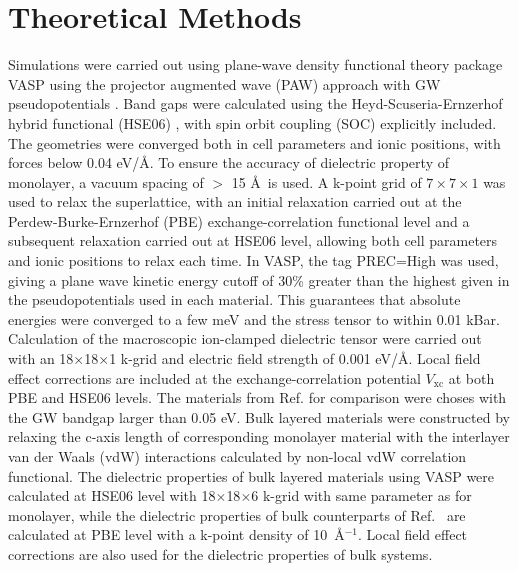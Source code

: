 \section{Theoretical Methods}
\label{sec:diel-org8457dbb}

Simulations were carried out using plane-wave density functional
theory package VASP
\cite{Kresse_1993_MD_liquid_metal,Kresse_1996_1,Kresse_1996_2} using
the projector augmented wave (PAW) approach with GW pseudopotentials
\cite{Kresse_1999_pseudopotentials}. Band gaps were calculated using
the Heyd-Scuseria-Ernzerhof hybrid functional (HSE06)
\cite{Heyd_2003_HSe,HSE_2006_erratum}, with spin orbit coupling (SOC) explicitly
included. The geometries were converged both in cell parameters and
ionic positions, with forces below 0.04 eV/\AA. To ensure the accuracy
of dielectric property of monolayer, a vacuum spacing of $>$ 15 \AA~is
used. A k-point grid of \(7\times7\times1\) was used to relax the
superlattice, with an initial relaxation carried out at the
Perdew-Burke-Ernzerhof
(PBE)\cite{Perdew_1996_GGA,Ernzerhof_1999,Paier_2005_PBE}
exchange-correlation functional level and a subsequent relaxation
carried out at HSE06 level, allowing both cell parameters and ionic
positions to relax each time. In VASP, the tag PREC=High was used,
giving a plane wave kinetic energy cutoff of 30\% greater than the
highest given in the pseudopotentials used in each material. This
guarantees that absolute energies were converged to a few meV and the
stress tensor to within 0.01 kBar.  Calculation of the macroscopic
ion-clamped dielectric tensor were carried out with an
18$\times$18$\times$1 k-grid and electric field strength of 0.001
eV/\AA.  Local field effect corrections are included at the
exchange-correlation potential $V_{\mathrm{xc}}$ at both PBE and HSE06
levels. The materials from Ref.\cite{Haastrup_2018_database} for comparison
were choses with the GW bandgap larger than 0.05 eV. Bulk layered
materials were constructed by relaxing the c-axis length of
corresponding monolayer material with the interlayer van der Waals
(vdW) interactions calculated by non-local vdW correlation
functional\cite{Lee_2010_vdFD2}.  The dielectric properties of bulk
layered materials using VASP were calculated at HSE06 level with
18$\times$18$\times$6 k-grid with same parameter as for monolayer,
while the dielectric properties of bulk counterparts of
Ref.~\cite{Haastrup_2018_database} are calculated at PBE level with a k-point
density of 10~\AA$^{-1}$. Local field effect corrections are also used
for the dielectric properties of bulk systems.


